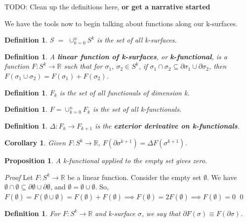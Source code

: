 \documentclass{book}
\newtheorem{defn}[equation]{Definition}
\newtheorem{coro}[equation]{Corollary}
\newtheorem{prop}[equation]{Proposition}
\renewenvironment{proof}{\emph{Proof}}{\qed}
\begin{document}
TODO: Clean up the definitions here, \textbf{or get a narrative started} 

We have the tools now to begin talking about functions along our k-surfaces. 

\begin{defn}
	S $=$ $\cup^n_{k=0}S^k$ is the set of all k-surfaces. 
\end{defn}

\begin{defn}
	A \textbf{linear function of k-surfaces}, or \textbf{k-functional}, is a function $F : S^k \to \mathbb{R}$ such that for $\sigma_1$, $\sigma_2 \in S^k$, if $\sigma_1 \cap \sigma_2 \subseteq \partial\sigma_1 \cup \partial\sigma_2$, then $F(\sigma_1\cup\sigma_2) = F(\sigma_1) + F(\sigma_2)$. 
\end{defn}

\begin{defn}
	$F_k$ is the set of all functionals of dimension k. 
\end{defn}

\begin{defn}
	$F = \cup_{k=0}^nF_k$ is the set of all k-functionals. 
\end{defn}

\begin{defn}
	$\Delta : F_k \to F_{k+1}$ is the \textbf{exterior derivative on k-functionals}. 
\end{defn}

\begin{coro}
	Given $F : S^k \to \mathbb{R}$, $F(\partial\sigma^{k+1}) = \Delta F(\sigma^{k+1})$. 
\end{coro}

\begin{prop}
	A k-functional applied to the empty set gives zero. 
\end{prop}
\begin{proof}
	Let $F : S^k \to \mathbb{R}$ be a linear function. Consider the empty set $\emptyset$. 
We have $\emptyset \cap \emptyset \subseteq \partial\emptyset \cup \partial\emptyset$, and $\emptyset = \emptyset\cup\emptyset$. 
So, $F(\emptyset) = F(\emptyset\cup\emptyset) = F(\emptyset) + F(\emptyset) \implies F(\emptyset) = 2F(\emptyset) \implies F(\emptyset) = 0$
\end{proof}


\begin{defn}
	For $F : S^k \to \mathbb{R}$ and k-surface $\sigma$, we say that $\partial F(\sigma) \equiv F(\partial\sigma)$. 
\end{defn}
\end{document}

